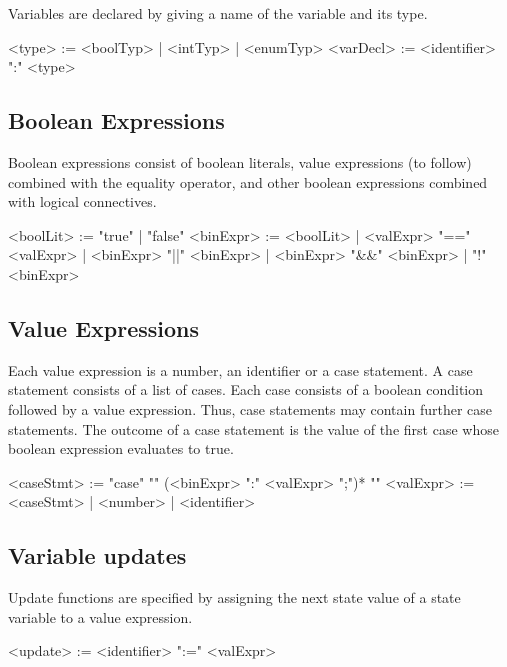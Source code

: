 Variables are declared by giving a name of the variable and its type.

\begin{bnflisting}
    <type>     := <boolTyp> | <intTyp> | <enumTyp>
    <varDecl>  := <identifier> ":" <type>
\end{bnflisting}

\subsection{Boolean Expressions}

Boolean expressions consist of boolean literals, value expressions (to follow) combined with the equality operator, and other boolean expressions combined with logical connectives.

\begin{bnflisting}
    <boolLit>  := "true" | "false"
    <binExpr>  := <boolLit> 
                | <valExpr> "==" <valExpr> 
                | <binExpr> "||" <binExpr> 
                | <binExpr> "&&" <binExpr> 
                | "!" <binExpr>
\end{bnflisting}

\subsection{Value Expressions}
Each value expression is a number, an identifier or a case statement. A case statement consists of a list of cases. Each case consists of a boolean condition followed by a value expression. Thus, case statements may contain further case statements. The outcome of a case statement is the value of the first case whose boolean expression evaluates to true.

\begin{bnflisting}
    <caseStmt> := "case" "{" 
                      (<binExpr> ":" <valExpr> ";")*
                  "}"
    <valExpr>  := <caseStmt> | <number> | <identifier>
\end{bnflisting}

\subsection{Variable updates}

Update functions are specified by assigning the next state value of a state variable to a value expression.

\begin{bnflisting}
    <update>   := <identifier> ":=" <valExpr>
\end{bnflisting}

